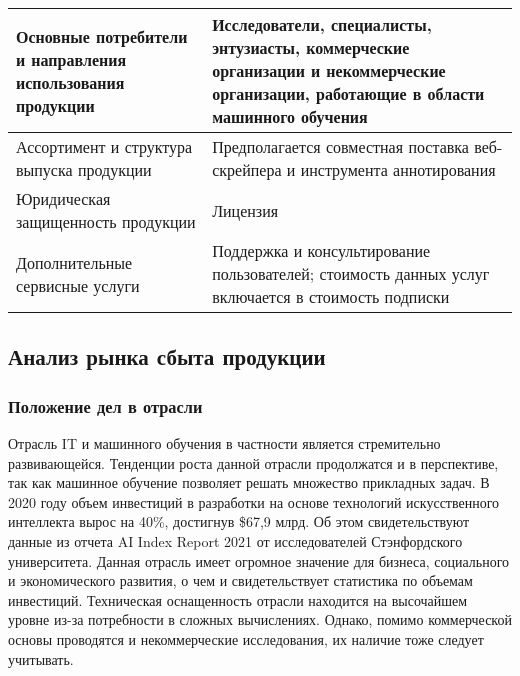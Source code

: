 \documentclass[../main]{subfiles}
\begin{document}
\begin{ltwrap}{2mm}{1}{\footnotesize}
\begin{longtable}[H]{|M{.2\x}|M{.8\x}|}
        \hline

        Основные потребители и направления использования продукции
        & Исследователи, специалисты, энтузиасты, коммерческие организации и некоммерческие организации, работающие в области машинного обучения\\
        
        \hline

        Ассортимент и структура выпуска продукции
        & Предполагается совместная поставка веб-скрейпера и инструмента аннотирования\\
        
        \hline

        Юридическая защищенность продукции
        & Лицензия\\
        
        \hline

        Дополнительные сервисные услуги
        & Поддержка и консультирование пользователей; стоимость данных услуг включается в стоимость подписки\\
        
        \hline
        
    \end{longtable}
\end{ltwrap}

\subsection{Анализ рынка сбыта продукции}
\subsubsection{Положение дел в отрасли}
Отрасль IT и машинного обучения в частности является стремительно развивающейся. Тенденции роста данной отрасли продолжатся и в перспективе, так как машинное обучение позволяет решать множество прикладных задач. В 2020 году объем инвестиций в разработки на основе технологий искусственного интеллекта вырос на 40\%, достигнув \$67,9 млрд. Об этом свидетельствуют данные из отчета AI Index Report 2021 от исследователей Стэнфордского университета. Данная отрасль имеет огромное значение для бизнеса, социального и экономического развития, о чем и свидетельствует статистика по объемам инвестиций. Техническая оснащенность отрасли находится на высочайшем уровне из-за потребности в сложных вычислениях. Однако, помимо коммерческой основы проводятся и некоммерческие исследования, их наличие тоже следует учитывать.
\end{document}
